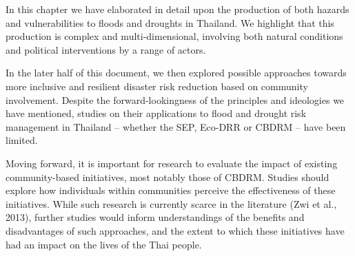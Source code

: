 In this chapter we have elaborated in detail upon the production of both hazards and vulnerabilities to floods and droughts in Thailand. We highlight that this production is complex and multi-dimensional, involving both natural conditions and political interventions by a range of actors. 

In the later half of this document, we then explored possible approaches towards more inclusive and resilient disaster risk reduction based on community involvement. Despite the forward-lookingness of the principles and ideologies we have mentioned, studies on their applications to flood and drought risk management in Thailand -- whether the SEP, Eco-DRR or CBDRM -- have been limited. 

Moving forward, it is important for research to evaluate the impact of existing community-based initiatives, most notably those of CBDRM. Studies should explore how individuals within communities perceive the effectiveness of these initiatives. While such research is currently scarce in the literature (Zwi et al., 2013), further studies would inform understandings of the benefits and disadvantages of such approaches, and the extent to which these initiatives have had an impact on the lives of the Thai people.
